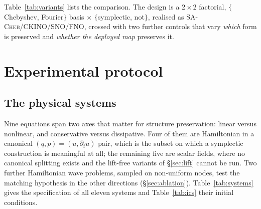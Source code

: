 \documentclass[11pt]{article}
\theoremstyle{definition}
\theoremstyle{remark}
\newcommand{\sacheb}{\textsc{SA-Cheb}}
\newcommand{\ckino}{\textsc{CKINO}}
\begin{document}
Table~\ref{tab:variants} lists the comparison. The design is a $2\times2$ factorial, $\{$Chebyshev, Fourier$\}$ basis $\times$ $\{$symplectic, not$\}$,
realised as \sacheb{}/\ckino{}/SNO/FNO, crossed with two further controls that
vary \emph{which} form is preserved and \emph{whether the deployed map} preserves
it.

\section{Experimental protocol}
\label{sec:setup}

\subsection{The physical systems}
\label{sec:systems}

Nine equations span two axes that matter for structure preservation: linear
versus nonlinear, and conservative versus dissipative. Four of them are
Hamiltonian in a canonical $(q,p)=(u,\partial_t u)$ pair, which is the subset on
which a symplectic construction is meaningful at all; the remaining five are
scalar fields, where no canonical splitting exists and the lift-free variants of
\S\ref{sec:lift} cannot be run. Two further Hamiltonian wave problems, sampled on
non-uniform nodes, test the matching hypothesis in the other directions
(\S\ref{sec:ablation}). Table~\ref{tab:systems} gives the specification of all
eleven systems and Table~\ref{tab:ics} their initial conditions.
\end{document}
